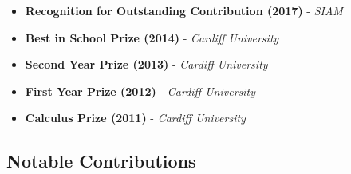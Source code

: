 \documentclass[10pt,a4paper,sans]{moderncv}        %
\begin{document}
\begin{multicols}{2}
\begin{itemize}

\item{\textbf{Recognition for Outstanding Contribution (2017)} - \small{\textit{SIAM}}}

\vspace{6pt}

\item{\textbf{Best in School Prize (2014)} - \small{\textit{Cardiff University}}}

\vspace{6pt}

\item{\textbf{Second Year Prize (2013)} - \small{\textit{Cardiff University}}}

\vspace{6pt}

\item{\textbf{First Year Prize (2012)} - \small{\textit{Cardiff University}}}

\vspace{6pt}

\item{\textbf{Calculus Prize (2011)} - \small{\textit{Cardiff University}}}

\end{itemize}
\end{multicols}

\subsection{Notable Contributions}

\vspace{5pt}
\end{document}
